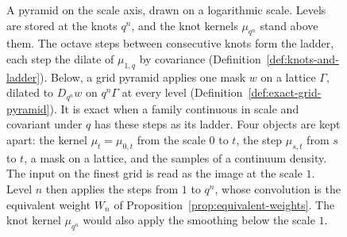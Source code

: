 \begin{figure}[t]
\centering
{}
\caption{A pyramid on the scale axis, drawn on a logarithmic scale. Levels are stored at the knots
$q^n$, and the knot kernels $\mu_{q^n}$ stand above them. The octave steps between consecutive
knots form the ladder, each step the dilate of $\mu_{1,q}$ by covariance
(Definition~\ref{def:knots-and-ladder}). Below, a grid pyramid applies one mask $w$ on a lattice
$\Gamma$, dilated to $D_{q^n}w$ on $q^n\Gamma$ at every level
(Definition~\ref{def:exact-grid-pyramid}). It is exact when a family continuous in scale and
covariant under $q$ has these steps as its ladder. Four objects are kept apart: the kernel
$\mu_t = \mu_{0,t}$ from the scale $0$ to $t$, the step $\mu_{s,t}$ from $s$ to $t$, a mask on a
lattice, and the samples of a continuum density. The input on the finest grid is read as the image
at the scale $1$. Level $n$ then applies the steps from $1$ to $q^n$, whose convolution is the
equivalent weight $W_n$ of Proposition~\ref{prop:equivalent-weights}. The knot kernel $\mu_{q^n}$
would also apply the smoothing below the scale $1$.}
\label{fig:pyramid-schematic}
\end{figure}

